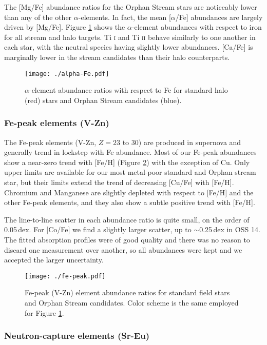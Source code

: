 \documentclass{emulateapj}
\begin{document}
The [Mg/Fe] abundance ratios for the Orphan Stream stars are noticeably lower than any of the other $\alpha$-elements. In fact, the mean [$\alpha$/Fe] abundances are largely driven by [Mg/Fe]. Figure \ref{fig:alpha-fe} shows the $\alpha$-element abundances with respect to iron for all stream and halo targets. Ti \textsc{i} and Ti \textsc{ii} behave similarly to one another in each star, with the neutral species having slightly lower abundances. [Ca/Fe] is marginally lower in the stream candidates than their halo counterparts. 

\begin{figure}[h]
	\texttt{[image: ./alpha-Fe.pdf]}
	\caption{$\alpha$-element abundance ratios with respect to Fe for standard halo (red) stars and Orphan Stream candidates (blue).}
	\label{fig:alpha-fe}
\end{figure}

\subsubsection{Fe-peak elements (V-Zn)}

The Fe-peak elements (V-Zn, $Z = 23$ to 30) are produced in supernova and generally trend in lockstep with Fe abundance. Most of our Fe-peak abundances show a near-zero trend with [Fe/H] (Figure \ref{fig:fe-peak}) with the exception of Cu. Only upper limits are available for our most metal-poor standard and Orphan stream star, but their limits extend the trend of decreasing [Cu/Fe] with [Fe/H]. Chromium and Manganese are slightly depleted with respect to [Fe/H] and the other Fe-peak elements, and they also show a subtle positive trend with [Fe/H].

The line-to-line scatter in each abundance ratio is quite small, on the order of 0.05\,dex. For [Co/Fe] we find a slightly larger scatter, up to $\sim$0.25\,dex in OSS 14. The fitted absorption profiles were of good quality and there was no reason to discard one measurement over another, so all abundances were kept and we accepted the larger uncertainty.

\begin{figure}[h]
	\texttt{[image: ./fe-peak.pdf]}
	\caption{Fe-peak (V-Zn) element abundance ratios for standard field stars and Orphan Stream candidates. Color scheme is the same employed for Figure \ref{fig:alpha-fe}.}
	\label{fig:fe-peak}
\end{figure}


\subsubsection{Neutron-capture elements (Sr-Eu)}
\end{document}

